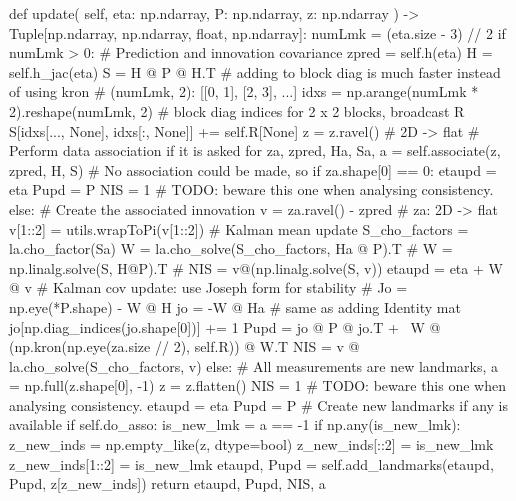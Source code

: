 \begin{pythoncode}
def update(
    self, eta: np.ndarray, P: np.ndarray, z: np.ndarray
) -> Tuple[np.ndarray, np.ndarray, float, np.ndarray]:
    numLmk = (eta.size - 3) // 2
    if numLmk > 0:
        # Prediction and innovation covariance
        zpred = self.h(eta)
        H = self.h_jac(eta)
        S = H @ P @ H.T
        # adding to block diag is much faster instead of using kron
        # (numLmk, 2): [[0, 1], [2, 3], ...]
        idxs = np.arange(numLmk * 2).reshape(numLmk, 2)
        # block diag indices for 2 x 2 blocks, broadcast R
        S[idxs[..., None], idxs[:, None]] += self.R[None]
        z = z.ravel()  # 2D -> flat
        # Perform data association if it is asked for
        za, zpred, Ha, Sa, a = self.associate(z, zpred, H, S)
        # No association could be made, so
        if za.shape[0] == 0:
            etaupd = eta
            Pupd = P
            NIS = 1  # TODO: beware this one when analysing consistency.
        else:
            # Create the associated innovation
            v = za.ravel() - zpred  # za: 2D -> flat
            v[1::2] = utils.wrapToPi(v[1::2])
            # Kalman mean update
            S_cho_factors = la.cho_factor(Sa)
            W = la.cho_solve(S_cho_factors, Ha @ P).T
            # W = np.linalg.solve(S, H@P).T
            # NIS = v@(np.linalg.solve(S, v))
            etaupd = eta + W @ v
            # Kalman cov update: use Joseph form for stability
            # Jo = np.eye(*P.shape) - W @ H
            jo = -W @ Ha
            # same as adding Identity mat
            jo[np.diag_indices(jo.shape[0])] += 1
            Pupd = jo @ P @ jo.T + \
                    W @ (np.kron(np.eye(za.size // 2), self.R)) @ W.T
            NIS = v @ la.cho_solve(S_cho_factors, v)
    else:  # All measurements are new landmarks,
        a = np.full(z.shape[0], -1)
        z = z.flatten()
        NIS = 1  # TODO: beware this one when analysing consistency.
        etaupd = eta
        Pupd = P
    # Create new landmarks if any is available
    if self.do_asso:
        is_new_lmk = a == -1
        if np.any(is_new_lmk):
            z_new_inds = np.empty_like(z, dtype=bool)
            z_new_inds[::2] = is_new_lmk
            z_new_inds[1::2] = is_new_lmk
            etaupd, Pupd = self.add_landmarks(etaupd, Pupd, z[z_new_inds])
    return etaupd, Pupd, NIS, a
\end{pythoncode}